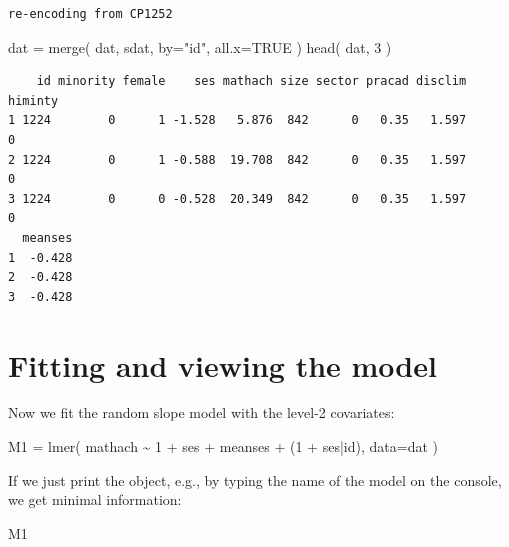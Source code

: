 \documentclass[
  letterpaper,
  DIV=11,
  numbers=noendperiod]{scrreprt}
\newenvironment{Shaded}{}{}
\newcommand{\AttributeTok}[1]{\textcolor[rgb]{0.49,0.56,0.16}{#1}}
\newcommand{\ConstantTok}[1]{\textcolor[rgb]{0.53,0.00,0.00}{#1}}
\newcommand{\DecValTok}[1]{\textcolor[rgb]{0.25,0.63,0.44}{#1}}
\newcommand{\FunctionTok}[1]{\textcolor[rgb]{0.02,0.16,0.49}{#1}}
\newcommand{\NormalTok}[1]{#1}
\newcommand{\OtherTok}[1]{\textcolor[rgb]{0.00,0.44,0.13}{#1}}
\newcommand{\SpecialCharTok}[1]{\textcolor[rgb]{0.25,0.44,0.63}{#1}}
\newcommand{\StringTok}[1]{\textcolor[rgb]{0.25,0.44,0.63}{#1}}
\begin{document}
\begin{verbatim}
re-encoding from CP1252
\end{verbatim}

\begin{Shaded}
\begin{Highlighting}[]
\NormalTok{dat }\OtherTok{=} \FunctionTok{merge}\NormalTok{( dat, sdat, }\AttributeTok{by=}\StringTok{"id"}\NormalTok{, }\AttributeTok{all.x=}\ConstantTok{TRUE}\NormalTok{ )}
\FunctionTok{head}\NormalTok{( dat, }\DecValTok{3}\NormalTok{ )}
\end{Highlighting}
\end{Shaded}

\begin{verbatim}
    id minority female    ses mathach size sector pracad disclim himinty
1 1224        0      1 -1.528   5.876  842      0   0.35   1.597       0
2 1224        0      1 -0.588  19.708  842      0   0.35   1.597       0
3 1224        0      0 -0.528  20.349  842      0   0.35   1.597       0
  meanses
1  -0.428
2  -0.428
3  -0.428
\end{verbatim}

\section{Fitting and viewing the
model}\label{fitting-and-viewing-the-model}

Now we fit the random slope model with the level-2 covariates:

\begin{Shaded}
\begin{Highlighting}[]
\NormalTok{M1 }\OtherTok{=} \FunctionTok{lmer}\NormalTok{( mathach }\SpecialCharTok{\textasciitilde{}} \DecValTok{1} \SpecialCharTok{+}\NormalTok{ ses }\SpecialCharTok{+}\NormalTok{ meanses }\SpecialCharTok{+}\NormalTok{ (}\DecValTok{1} \SpecialCharTok{+}\NormalTok{ ses}\SpecialCharTok{|}\NormalTok{id), }\AttributeTok{data=}\NormalTok{dat )}
\end{Highlighting}
\end{Shaded}

If we just print the object, e.g., by typing the name of the model on
the console, we get minimal information:

\begin{Shaded}
\begin{Highlighting}[]
\NormalTok{M1}
\end{Highlighting}
\end{Shaded}
\end{document}
